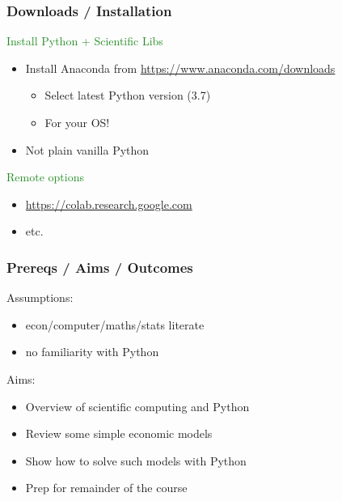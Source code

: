 \documentclass[
    xcolor={svgnames},
    hyperref={colorlinks, citecolor=DeepPink4, linkcolor=DarkRed, urlcolor=DarkBlue}
    ]{beamer}  %
\newcommand{\green}[1]{\textcolor{ForestGreen}{\sf #1}}
\newcommand{\1}{\mathbbm 1}
\begin{document}
\begin{frame}
    \frametitle{Downloads / Installation }

    \green{Install Python + Scientific Libs}
    
    \begin{itemize}
        \item Install Anaconda from {\footnotesize \url{https://www.anaconda.com/downloads}}
        \vspace{1em}
            \begin{itemize}
                \item Select latest Python version (3.7)
                \item For your OS!
            \end{itemize}
        \vspace{1em}
        \item Not plain vanilla Python
    \end{itemize}


    \vspace{1em}

    \green{Remote options}

    \begin{itemize}
        \item \url{https://colab.research.google.com}
        \item etc.
    \end{itemize}


\end{frame}






\begin{frame}
    \frametitle{Prereqs / Aims / Outcomes }

    Assumptions:

    \begin{itemize}
        \item econ/computer/maths/stats literate
        \vspace{0.3em}
        \item no familiarity with Python
    \end{itemize}

    \vspace{0.3em}
    \vspace{0.3em}

    Aims:
    \begin{itemize}
        \item Overview of scientific computing and Python
            \vspace{0.3em}
        \item Review some simple economic models
            \vspace{0.3em}
        \item Show how to solve such models with Python
            \vspace{0.3em}
        \item Prep for remainder of the course
    \end{itemize}

\end{frame}
\end{document}
